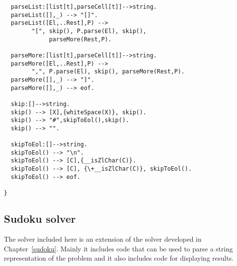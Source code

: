 \begin{verbatim}
  parseList:[list[t],parseCell[t]]-->string.
  parseList([],_) --> "[]".
  parseList([El,..Rest],P) -->
        "[", skip(), P.parse(El), skip(),
             parseMore(Rest,P).

  parseMore:[list[t],parseCell[t]]-->string.
  parseMore([El,..Rest],P) --> 
        ",", P.parse(El), skip(), parseMore(Rest,P).
  parseMore([],_) --> "]".
  parseMore([],_) --> eof.

  skip:[]-->string.
  skip() --> [X],{whiteSpace(X)}, skip().
  skip() --> "#",skipToEol(),skip().
  skip() --> "".

  skipToEol:[]-->string.
  skipToEol() --> "\n".
  skipToEol() --> [C],{__isZlChar(C)}.
  skipToEol() --> [C], {\+__isZlChar(C)}, skipToEol().
  skipToEol() --> eof.

}
\end{verbatim}

\subsection{Sudoku solver}
\label{sample:sudoku:solver}
The solver included here is an extension of the solver developed in Chapter~\vref{sudoku}. Mainly it includes code that can be used to parse a string representation of the problem and it also includes code for displaying results.


